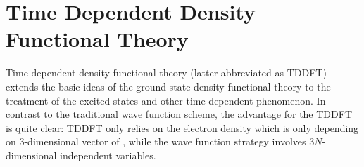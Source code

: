 %
%
%
%
%
%
%
%
%
%
%
%
%
%
%
%
%
%
\chapter{Time Dependent Density Functional Theory}
%
%
Time dependent density functional theory (latter abbreviated as
TDDFT) extends the basic ideas of the ground state density
functional theory to the treatment of the excited states and other
time dependent phenomenon. In contrast to the traditional wave
function scheme, the advantage for the TDDFT is quite clear: TDDFT
only relies on the electron density which is only depending on
$3$-dimensional vector of , while the wave function strategy
involves $3N$-dimensional independent variables.

